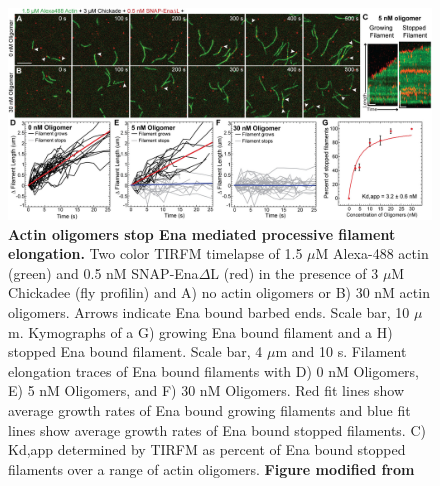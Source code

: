 \begin{figure}
\centering
\includegraphics[width=\textwidth]{img/ch04/Oligomer_Ena_Figure.jpg}
\caption[Actin oligomers stop Ena mediated processive filament elongation.]{\textbf{Actin oligomers stop Ena mediated processive filament elongation.} Two color TIRFM timelapse of 1.5 $\mu$M Alexa-488 actin (green) and 0.5 nM SNAP-Ena$\Delta$L (red) in the presence of 3 $\mu$M Chickadee (fly profilin) and A) no actin oligomers or B) 30 nM actin oligomers. Arrows indicate Ena bound barbed ends. Scale bar, 10 $\mu$m. Kymographs of a G) growing Ena bound filament and a H) stopped Ena bound filament. Scale bar, 4 $\mu$m and 10 s. Filament elongation traces of Ena bound filaments with D) 0 nM Oligomers, E) 5 nM Oligomers, and F) 30 nM Oligomers. Red fit lines show average growth rates of Ena bound growing filaments and blue fit lines show average growth rates of Ena bound stopped filaments. C) Kd,app determined by TIRFM as percent of Ena bound stopped filaments over a range of actin oligomers. \textbf{Figure modified from \citep{kudryashova_actin_2018}}}
\label{fig:ena-oligomers}
\end{figure}

